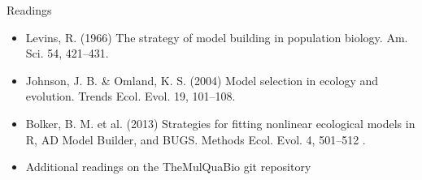 \documentclass[xcolor=x11names,compress]{beamer}
\renewcommand{\(}{\begin{columns}}
\renewcommand{\)}{\end{columns}}
\newcommand{\<}[1]{\begin{column}{#1}}
\renewcommand{\>}{\end{column}}
\begin{document}
\begin{frame}{Readings}

\begin{itemize}\itemsep10pt

\item Levins, R. (1966) The strategy of model building in population 
biology. Am. Sci. 54, 421--431.  

\item Johnson, J. B. \& Omland, K. S. (2004) Model selection in ecology 
and evolution. Trends Ecol. Evol. 19, 101--108. 

\item Bolker, B. M. et al.  (2013) Strategies for fitting nonlinear ecological models in R, AD Model Builder, and BUGS. Methods Ecol. Evol. 4, 501--512 .


\item Additional readings on the TheMulQuaBio git repository
 
\end{itemize}
\end{frame}
\end{document}
